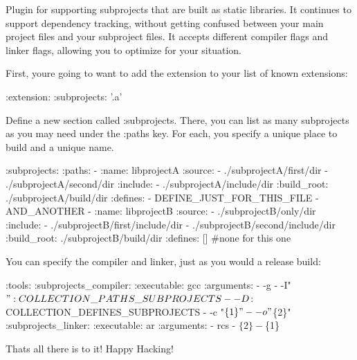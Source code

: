 Plugin for supporting subprojects that are built as static libraries. It continues to support dependency tracking, without getting confused between your main project files and your subproject files. It accepts different compiler flags and linker flags, allowing you to optimize for your situation.

First, you\textquotesingle{}re going to want to add the extension to your list of known extensions\+:


\begin{DoxyCode}
:extension:
  :subprojects: '.a'
\end{DoxyCode}


Define a new section called \+:subprojects. There, you can list as many subprojects as you may need under the \+:paths key. For each, you specify a unique place to build and a unique name.


\begin{DoxyCode}
:subprojects:  
  :paths:
   - :name: libprojectA
     :source:
       - ./subprojectA/first/dir
       - ./subprojectA/second/dir
     :include:
       - ./subprojectA/include/dir
     :build\_root: ./subprojectA/build/dir
     :defines: 
       - DEFINE\_JUST\_FOR\_THIS\_FILE
       - AND\_ANOTHER
   - :name: libprojectB
     :source:
       - ./subprojectB/only/dir
     :include:
       - ./subprojectB/first/include/dir
       - ./subprojectB/second/include/dir
     :build\_root: ./subprojectB/build/dir
     :defines: [] #none for this one
\end{DoxyCode}


You can specify the compiler and linker, just as you would a release build\+:


\begin{DoxyCode}
:tools:
  :subprojects\_compiler:
    :executable: gcc
    :arguments:
      - -g
      - -I"$": COLLECTION\_PATHS\_SUBPROJECTS
      - -D$: COLLECTION\_DEFINES\_SUBPROJECTS
      - -c "$\{1\}"
      - -o "$\{2\}"
  :subprojects\_linker:
    :executable: ar
    :arguments:
      - rcs
      - $\{2\}
      - $\{1\}
\end{DoxyCode}


That\textquotesingle{}s all there is to it! Happy Hacking! 